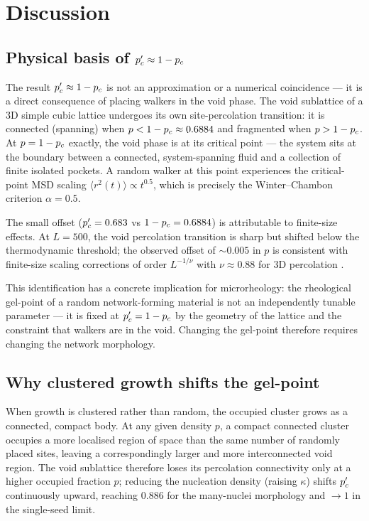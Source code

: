 \section{Discussion}
\label{sec:discussion}

\subsection{Physical basis of $p_c' \approx 1 - p_c$}

The result $p_c' \approx 1 - p_c$ is not an approximation or a numerical coincidence — it is a direct consequence of placing walkers in the void phase. The void sublattice of a 3D simple cubic lattice undergoes its own site-percolation transition: it is connected (spanning) when $p < 1 - p_c \approx 0.6884$ and fragmented when $p > 1 - p_c$. At $p = 1 - p_c$ exactly, the void phase is at its critical point — the system sits at the boundary between a connected, system-spanning fluid and a collection of finite isolated pockets. A random walker at this point experiences the critical-point MSD scaling $\langle r^2(t) \rangle \propto t^{0.5}$, which is precisely the Winter--Chambon criterion $\alpha = 0.5$.

The small offset ($p_c' = 0.683$ vs $1 - p_c = 0.6884$) is attributable to finite-size effects. At $L = 500$, the void percolation transition is sharp but shifted below the thermodynamic threshold; the observed offset of $\sim 0.005$ in $p$ is consistent with finite-size scaling corrections of order $L^{-1/\nu}$ with $\nu \approx 0.88$ for 3D percolation \citep{Ballesteros1999}.

This identification has a concrete implication for microrheology: the rheological gel-point of a random network-forming material is not an independently tunable parameter — it is fixed at $p_c' = 1 - p_c$ by the geometry of the lattice and the constraint that walkers are in the void. Changing the gel-point therefore requires changing the network morphology.

\subsection{Why clustered growth shifts the gel-point}

When growth is clustered rather than random, the occupied cluster grows as a connected, compact body. At any given density $p$, a compact connected cluster occupies a more localised region of space than the same number of randomly placed sites, leaving a correspondingly larger and more interconnected void region. The void sublattice therefore loses its percolation connectivity only at a higher occupied fraction $p$; reducing the nucleation density (raising $\kappa$) shifts $p_c'$ continuously upward, reaching $0.886$ for the many-nuclei morphology and $\to 1$ in the single-seed limit.

